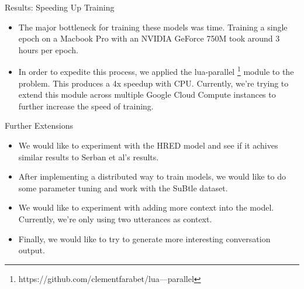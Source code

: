 \documentclass{beamer}
\begin{document}
\begin{frame}{Results: Speeding Up Training}

\begin{itemize}
\item The major bottleneck for training these models was time. Training a single epoch on a Macbook Pro with an NVIDIA GeForce 750M took around 3 hours per epoch.
\item In order to expedite this process, we applied the lua-parallel \footnote{https://github.com/clementfarabet/lua---parallel} module to the problem. This produces a 4x speedup with CPU. Currently, we're trying to extend this module across multiple Google Cloud Compute instances to further increase the speed of training.
\end{itemize}
\end{frame}


\begin{frame}{Further Extensions}
\begin{itemize}
\item We would like to experiment with the HRED model and see if it achives similar results to Serban et al's results. 
\item After implementing a distributed way to train models, we would like to do some parameter tuning and work with the SuBtle dataset.
\item We would like to experiment with adding more context into the model. Currently, we're only using two utterances as context. 
\item Finally, we would like to try to generate more interesting conversation output.
\end{itemize}
\end{frame}
\end{document}
